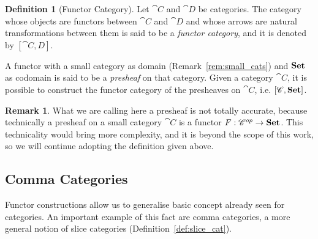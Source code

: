 \documentclass[a4paper, twoside,openright]{report}
\theoremstyle{plain}
\theoremstyle{definition}
\newtheorem{definition}[theorem]{Definition}
\newtheorem{remark}[theorem]{Remark}
\begin{document}
\begin{definition}[Functor Category]\label{def:functor_category}
    Let $\cat C$ and $\cat D$ be categories. The category whose objects are functors between $\cat C$ and $\cat D$ and whose arrows are natural transformations between them is said to be a \emph{functor category}, and it is denoted by $[\cat{C, D}]$.
\end{definition}

A functor with a small category as domain (Remark~\ref{rem:small_cats}) and $\mathbf{Set}$ as codomain is said to be a \emph{presheaf} on that category. Given a category $\cat C$, it is possible to construct the functor category of the presheaves on $\cat C$, i.e. $[\mathscr{C}, \mathbf{Set}]$.

\begin{remark}
    What we are calling here a presheaf is not totally accurate, because technically a presheaf on a small category $\cat C$ is a functor $F: \mathscr{C} ^{op} \rightarrow \mathbf{Set}$. This technicality would bring more complexity, and it is beyond the scope of this work, so we will continue adopting the definition given above.
\end{remark}

\subsection{Comma Categories}

Functor constructions allow us to generalise basic concept already seen for categories. An important example of this fact are comma categories, a more general notion of slice categories (Definition~\ref{def:slice_cat}).

\end{document}

